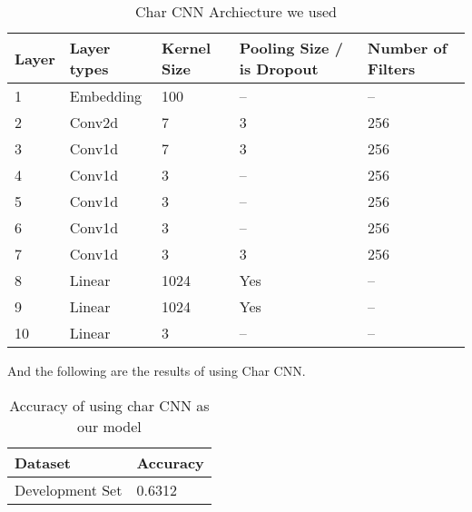\documentclass{article}
\begin{document}
\begin{table}[htb]
\caption{Char CNN Archiecture we used}
	\label{sample-table}
	\centering
\begin{tabular}{lllll}
\toprule
		\cmidrule{1-5}
		Layer & Layer types & Kernel Size & Pooling Size / is Dropout & Number of Filters 		\\
		\midrule
 			1 & Embedding & 100 & -- & -- \\
 			2 & Conv2d & 7 & 3 & 256 \\
 			3 & Conv1d & 7 & 3 & 256 \\
 			4 & Conv1d & 3 & -- & 256 \\
 			5 & Conv1d & 3 & -- & 256\\
 			6 & Conv1d & 3 & -- & 256 \\
 			7 & Conv1d & 3 & 3 & 256 \\
 			8 & Linear & 1024 & Yes & -- \\
 			9 & Linear & 1024 & Yes & -- \\
 			10 & Linear & 3 & -- & -- \\
\bottomrule
\end{tabular}
\end{table}

And the following are the results of using Char CNN. 

\begin{table}[htb]
	\caption{Accuracy of using char CNN as our model}
	\label{sample-table}
	\centering
	\begin{tabular}{ll}
		\toprule
		\cmidrule{1-2}
		Dataset &Accuracy\\
		\midrule
		Development Set & 0.6312  \\
		\bottomrule
	\end{tabular}
\end{table}
\end{document}
